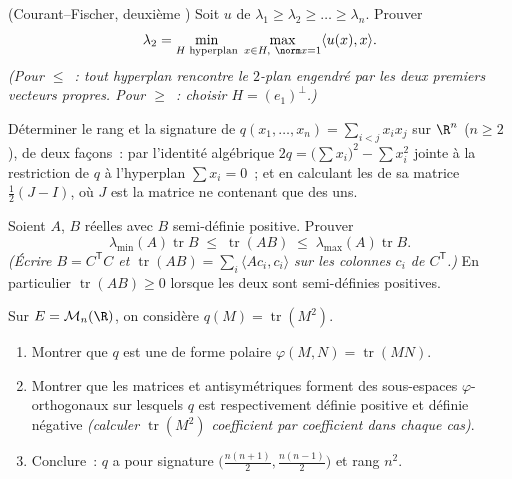 \begin{exercise}[$\star\star\star$]\label{exo:b2:quadratic:9}
(Courant--Fischer, deuxième ) Soit $u$  de
 $\lambda_1 \geq \lambda_2 \geq \dots \geq
\lambda_n$. Prouver
\[
\lambda_2 = \min_{\substack{H \text{ hyperplan}}}\;
\max_{\substack{x \in H,\ \norm x = 1}} \langle u(x), x\rangle .
\]
\emph{(Pour $\leq$~: tout hyperplan rencontre le $2$-plan engendré
par les deux premiers vecteurs propres. Pour $\geq$~: choisir $H =
(e_1)^{\perp}$.)}
\end{exercise}

\begin{exercise}[$\star\star$]\label{exo:b2:quadratic:10}
Déterminer le rang et la signature de $q(x_1, \dots, x_n) = \sum_{i
< j} x_ix_j$ sur $\R^n$ ($n \geq 2$), de deux façons~: par
l'identité algébrique $2q = \bigl(\sum x_i\bigr)^2 - \sum x_i^2$
jointe à la restriction de $q$ à l'hyperplan $\sum x_i = 0$~; et en
calculant les  de sa matrice $\frac12(J - I)$, où $J$
est la matrice ne contenant que des uns.
\end{exercise}

\begin{exercise}[$\star\star$]\label{exo:b2:quadratic:11}
Soient $A$, $B$  réelles avec $B$ semi-définie positive.
Prouver
\[
\lambda_{\min}(A)\operatorname{tr} B
\;\leq\;
\operatorname{tr}(AB)
\;\leq\;
\lambda_{\max}(A)\operatorname{tr} B .
\]
\emph{(Écrire $B = C^{\mathsf T}C$ et $\operatorname{tr}(AB) =
\sum_i \langle A c_i, c_i\rangle$ sur les colonnes $c_i$ de
$C^{\mathsf T}$.)} En particulier $\operatorname{tr}(AB) \geq 0$
lorsque les deux sont semi-définies positives.
\end{exercise}

\begin{exercise}[$\star\star\star$]\label{exo:b2:quadratic:12}
Sur $E = \mathcal{M}_n(\R)$, on considère $q(M) =
\operatorname{tr}(M^2)$.
\begin{enumerate}
  \item Montrer que $q$ est une  de forme polaire
        $\varphi(M, N) = \operatorname{tr}(MN)$.
  \item Montrer que les matrices  et antisymétriques
        forment des sous-espaces $\varphi$-orthogonaux sur lesquels
        $q$ est respectivement définie positive et définie négative
        \emph{(calculer $\operatorname{tr}(M^2)$ coefficient par
        coefficient dans chaque cas)}.
  \item Conclure~: $q$ a pour signature $\bigl(\frac{n(n+1)}{2},
        \frac{n(n-1)}{2}\bigr)$ et rang $n^2$.
\end{enumerate}
\end{exercise}

